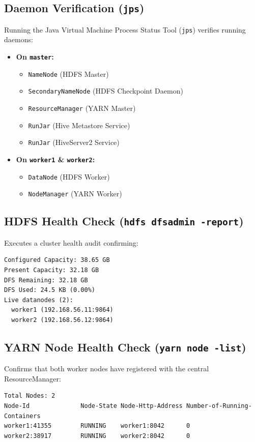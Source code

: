 \documentclass[11pt,a4paper]{article}
\begin{document}
\subsection{Daemon Verification (\texttt{jps})}
Running the Java Virtual Machine Process Status Tool (\texttt{jps}) verifies running daemons:
\begin{itemize}
    \item \textbf{On \texttt{master}:}
    \begin{itemize}
        \item \texttt{NameNode} (HDFS Master)
        \item \texttt{SecondaryNameNode} (HDFS Checkpoint Daemon)
        \item \texttt{ResourceManager} (YARN Master)
        \item \texttt{RunJar} (Hive Metastore Service)
        \item \texttt{RunJar} (HiveServer2 Service)
    \end{itemize}
    \item \textbf{On \texttt{worker1} \& \texttt{worker2}:}
    \begin{itemize}
        \item \texttt{DataNode} (HDFS Worker)
        \item \texttt{NodeManager} (YARN Worker)
    \end{itemize}
\end{itemize}

\subsection{HDFS Health Check (\texttt{hdfs dfsadmin -report})}
Executes a cluster health audit confirming:
\begin{lstlisting}[caption={HDFS Cluster Report Excerpt}]
Configured Capacity: 38.65 GB
Present Capacity: 32.18 GB
DFS Remaining: 32.18 GB
DFS Used: 24.5 KB (0.00%)
Live datanodes (2):
  worker1 (192.168.56.11:9864)
  worker2 (192.168.56.12:9864)
\end{lstlisting}

\subsection{YARN Node Health Check (\texttt{yarn node -list})}
Confirms that both worker nodes have registered with the central ResourceManager:
\begin{lstlisting}[caption={YARN Active Node Managers Report}]
Total Nodes: 2
Node-Id              Node-State Node-Http-Address Number-of-Running-Containers
worker1:41355        RUNNING    worker1:8042      0
worker2:38917        RUNNING    worker2:8042      0
\end{lstlisting}
\end{document}

